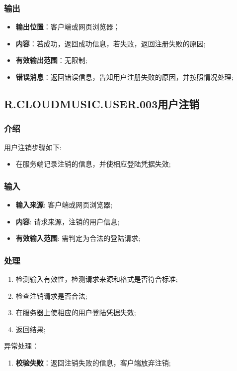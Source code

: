 \begin{enumerate}
\subsubsection{输出}
\begin{itemize}
	\item \textbf{输出位置}：客户端或网页浏览器；
	\item \textbf{内容}：若成功，返回成功信息，若失败，返回注册失败的原因;
	\item \textbf{有效输出范围}：无限制;
	\item \textbf{错误消息}：返回错误信息，告知用户注册失败的原因，并按照情况处理;
\end{itemize}

\subsection{R.CLOUDMUSIC.USER.003用户注销}
\subsubsection{介绍}
用户注销步骤如下:
	\begin{itemize}
		\item 在服务端记录注销的信息，并使相应登陆凭据失效;
	\end{itemize}
\subsubsection{输入}
	\begin{itemize}
		\item \textbf{输入来源}: 客户端或网页浏览器;
		\item \textbf{内容}: 请求来源，注销的用户信息;
		\item \textbf{有效输入范围}: 需判定为合法的登陆请求;
	\end{itemize}
\subsubsection{处理}
	\begin{enumerate}
		\item 检测输入有效性，检测请求来源和格式是否符合标准;
		\item 检查注销请求是否合法;
		\item 在服务器上使相应的用户登陆凭据失效;
		\item 返回结果;
	\end{enumerate}
	\noindent 异常处理：
	\begin{enumerate}
		\item \textbf{校验失败}：返回注销失败的信息，客户端放弃注销;
	\end{enumerate}

\end{enumerate}
